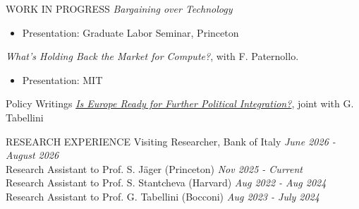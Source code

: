 \documentclass{resume} %
\begin{document}
	\vspace{-0.2cm}
	\begin{rSection}{WORK IN PROGRESS}
		\renewcommand\labelitemi{$\vcenter{\hbox{\tiny$\bullet$}}$}
		\textit{Bargaining over Technology}
		\vspace{-0.17cm}
		\begin{itemize}[leftmargin=*]\itemsep=-0.2cm
			\item \footnotesize {Presentation: Graduate Labor Seminar, Princeton}
		\end{itemize}
		\textit{What's Holding Back the Market for Compute?}, with F. Paternollo.
		\vspace{-0.17cm}
		\begin{itemize}[leftmargin=*]\itemsep=-0.2cm
			\item \footnotesize {Presentation: MIT}
		\end{itemize}
	\end{rSection}
	
	
	
	\vspace{-0.2cm}
	\begin{rSection}{Policy Writings}
		\href{https://iep.unibocconi.eu/sites/default/files/media/attach/IEP\%40BU_Is_Europe_Ready_For_Further_Political_Integration.pdf}{\textit{Is Europe Ready for Further Political Integration?}}, joint with G. Tabellini
		\vspace{-0.17cm}

	\end{rSection}
	
	\begin{rSection}{RESEARCH EXPERIENCE}
		Visiting Researcher, Bank of Italy
		\hfill {\textit{June 2026 - August 2026}}\\
		Research Assistant to Prof. S. J\"ager (Princeton)
		\hfill {\textit{Nov 2025 - Current}}\\
		Research Assistant to Prof. S. Stantcheva (Harvard)
		\hfill {\textit{Aug 2022 - Aug 2024}}\\
		Research Assistant to Prof. G. Tabellini (Bocconi)
		\hfill \textit{Aug 2023 - July 2024}
	\end{rSection}
\vspace{-0.2cm}
	
\end{document}
